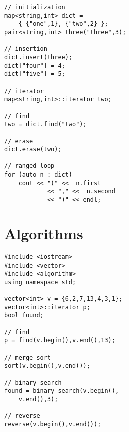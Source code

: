 \documentclass[10pt]{article}
\begin{document}
\begin{multicols*}{3}
\begin{lstlisting}
// initialization
map<string,int> dict = 
    { {"one",1}, {"two",2} };
pair<string,int> three("three",3);

// insertion    
dict.insert(three);
dict["four"] = 4;
dict["five"] = 5;

// iterator    
map<string,int>::iterator two;

// find    
two = dict.find("two");

// erase    
dict.erase(two);

// ranged loop
for (auto n : dict)
    cout << "(" <<  n.first
            << "," <<  n.second 
            << ")" << endl;
\end{lstlisting}
%
%
\section*{Algorithms}
\small
\lstset {language=C++}
\begin{lstlisting}
#include <iostream>
#include <vector>
#include <algorithm>
using namespace std;

vector<int> v = {6,2,7,13,4,3,1};
vector<int>::iterator p;
bool found;

// find
p = find(v.begin(),v.end(),13);

// merge sort
sort(v.begin(),v.end());

// binary search
found = binary_search(v.begin(),
    v.end(),3);

// reverse
reverse(v.begin(),v.end());
\end{lstlisting}
\end{multicols*}
\end{document}
